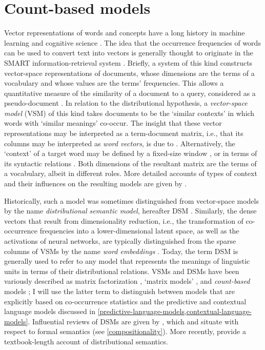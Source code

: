 
\section{Count-based models}
\label{count-based-models}

Vector representations of words and concepts have a long history in machine learning
and cognitive science \parencites[143-144]{Turney2010}[15-16]{Lenci2023}.
The idea that the occurrence frequencies of words can be used to convert text into
vectors is generally thought to originate in the SMART information-retrieval system
\parencites{Salton1971}[cf.][19-20]{Lenci2023}.
Briefly, a system of this kind constructs vector-space representations of documents,
whose dimensions are the terms of a vocabulary and whose values are the terms'
frequencies.
This allows a quantitative measure of the similarity of a document to a query,
considered as a pseudo-document \parencites[108-110]{Jurafsky2023}.
In relation to the distributional hypothesis, a \emph{vector-space model} (VSM) of this
kind takes documents to be the `similar contexts' in which words with `similar
meanings' co-occur.
The insight that these vector representations may be interpreted as a term-document
matrix, i.e., that its columns may be interpreted as \emph{word vectors}, is due to
\textcites[394-395]{Deerwester1990}.
Alternatively, the `context' of a target word may be defined by a fixed-size window
\parencites{Lund1996}, or in terms of its syntactic relations
\parencites{Lin1998}{Pado2007}.
Both dimensions of the resultant matrix are the terms of a vocabulary, albeit in
different roles.
More detailed accounts of types of context and their influences on the resulting models
are given by \textcites[152-154,158]{Lenci2018}[39-48]{Lenci2023}.

Historically, such a model was sometimes distinguished from vector-space models by the
name \emph{distributional semantic model}, hereafter DSM
\parencites[166]{Gastaldi2021}.
Similarly, the dense vectors that result from dimensionality reduction, i.e., the
transformation of co-occurrence frequencies into a lower-dimensional latent space, as
well as the activations of neural networks, are typically distinguished from the sparse
columns of VSMs by the name \emph{word embeddings}
\parencites[65]{Lenci2023}[107,119]{Jurafsky2023}.
Today, the term DSM is generally used to refer to any model that represents the
meanings of linguistic units in terms of their distributional relations.
VSMs and DSMs have been variously described as matrix factorization
\parencites[1533]{Pennington2014}, `matrix models'
\parencites[167]{Gastaldi2021}[97-125]{Lenci2023}, and \emph{count-based} models
\parencites{Baroni2014a}; I will use the latter term to distinguish between models that
are explicitly based on co-occurrence statistics and the predictive and contextual
language models discussed in
\cref{predictive-language-models,contextual-language-models}.
Influential reviews of DSMs are given by \textcites{Lenci2008}{Turney2010}, which
\textcites{Erk2012} and \textcites{Clark2015} situate with respect to formal semantics
(see \cref{compositionality}).
More recently, \textcites{Lenci2023} provide a textbook-length account of
distributional semantics.

